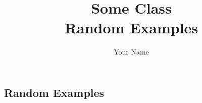 \documentclass{report}
\title{\Huge{Some Class}\\Random Examples}
\author{\huge{Your Name}}
\date{}
\begin{document}
\maketitle
\newpage%
\tableofcontents
\pagebreak

\chapter{}
\section{Random Examples}
\dfn{}{

}
\end{document}
